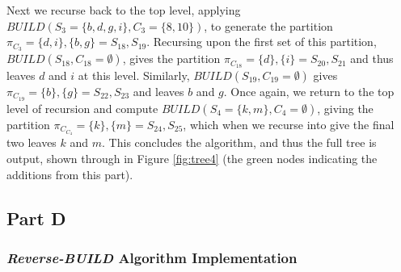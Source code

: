 \documentclass[a4paper, 11pt]{article}
\begin{document}
	Next we recurse back to the top level, applying $BUILD(S_{3} = \{b, d, g, i\}, C_{3} = \{8, 10\})$, to generate the partition $\pi_{C_{3}} = \{d, i\}, \{b, g\} = S_{18}, S_{19}$. Recursing upon the first set of this partition, $BUILD(S_{18}, C_{18} = \emptyset)$, gives the partition $\pi_{C_{18}} = \{d\}, \{i\} = S_{20}, S_{21}$ and thus leaves $d$ and $i$ at this level. Similarly, $BUILD(S_{19}, C_{19} = \emptyset)$ gives $\pi_{C_{19}} = \{b\}, \{g\} = S_{22}, S_{23}$ and leaves $b$ and $g$. Once again, we return to the top level of recursion and compute $BUILD(S_{4} = \{k, m\}, C_{4} = \emptyset)$, giving the partition $\pi_{C_{C_{4}}} = \{k\}, \{m\} = S_{24}, S_{25}$, which when we recurse into give the final two leaves $k$ and $m$. This concludes the algorithm, and thus the full tree is output, shown through in Figure \ref{fig:tree4} (the green nodes indicating the additions from this part).
	
	\subsection{Part D}
	\label{section:2D}
	\subsubsection{\emph{Reverse-BUILD} Algorithm Implementation}
	
\end{document}
